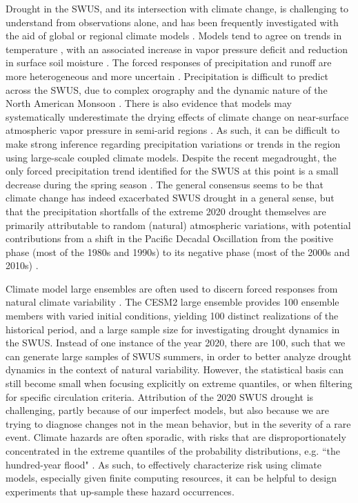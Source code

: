\documentclass[draft]{agujournal2019}
\begin{document}
Drought in the SWUS, and its intersection with climate change, is challenging to understand from observations alone, and has been frequently investigated with the aid of global or regional climate models \cite{cook2018}.
Models tend to agree on trends in temperature \cite{kumar2013, papalexiou2020}, with an associated increase in vapor pressure deficit and reduction in surface soil moisture \cite{fang2022,berg2017}.
The forced responses of precipitation and runoff are more heterogeneous and more uncertain \cite{kumar2013, shepherd2014, wu2024}.
Precipitation is difficult to predict across the SWUS, due to complex orography and the dynamic nature of the North American Monsoon \cite{cook2020,pascale2017}.
There is also evidence that models may systematically underestimate the drying effects of climate change on near-surface atmospheric vapor pressure in semi-arid regions \cite{simpson2024}.
As such, it can be difficult to make strong inference regarding precipitation variations or trends in the region using large-scale coupled climate models.
Despite the recent megadrought, the only forced precipitation trend identified for the SWUS at this point is a small decrease during the spring season \cite{seager2022}.
The general consensus seems to be that climate change has indeed exacerbated SWUS drought in a general sense, but that the precipitation shortfalls of the extreme 2020 drought themselves are primarily attributable to random (natural) atmospheric variations, with potential contributions from a shift in the Pacific Decadal Oscillation from the positive phase (most of the 1980s and 1990s) to its negative phase (most of the 2000s and 2010s) \cite{mankin2021,seager2022, jiang2025}.

Climate model large ensembles are often used to discern forced responses from natural climate variability \cite{deser2020}. 
The CESM2 large ensemble \cite{rodgers2021} provides 100 ensemble members with varied initial conditions, yielding 100 distinct realizations of the historical period, and a large sample size for investigating drought dynamics in the SWUS.
Instead of one instance of the year 2020, there are 100, such that we can generate large samples of SWUS summers, in order to better analyze drought dynamics in the context of natural variability.
However, the statistical basis can still become small when focusing explicitly on extreme quantiles, or when filtering for specific circulation criteria. 
Attribution of the 2020 SWUS drought is challenging, partly because of our imperfect models, but also because we are trying to diagnose changes not in the mean behavior, but in the severity of a rare event.
Climate hazards are often sporadic, with risks that are disproportionately concentrated in the extreme quantiles of the probability distributions, e.g. ``the hundred-year flood" \cite{newman2023}.
As such, to effectively characterize risk using climate models, especially given finite computing resources, it can be helpful to design experiments that up-sample these hazard occurrences.
\end{document}

